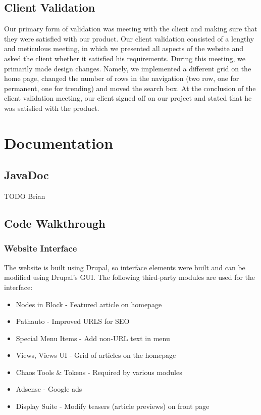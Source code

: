 \documentclass[11pt]{article} %
\begin{document}
\subsection{Client Validation}

Our primary form of validation was meeting with the client and making sure that they were satisfied with our product. Our client validation consisted of a lengthy and meticulous meeting, in which we presented all aspects of the website and asked the client whether it satisfied his requirements. During this meeting, we primarily made design changes. Namely, we implemented a different grid on the home page, changed the number of rows in the navigation (two row, one for permanent, one for trending) and moved the search box. At the conclusion of the client validation meeting, our client signed off on our project and stated that he was satisfied with the product. 

\section{Documentation}

\subsection{JavaDoc}

TODO Brian

\subsection{Code Walkthrough}

\subsubsection{Website Interface}

The website is built using Drupal, so interface elements were built and can be modified using Drupal’s GUI. The following third-party modules are used for the interface:

\begin{itemize}
\item Nodes in Block - Featured article on homepage
\item Pathauto - Improved URLS for SEO
\item Special Menu Items - Add non-URL text in menu
\item Views, Views UI - Grid of articles on the homepage
\item Chaos Tools \& Tokens - Required by various modules
\item Adsense - Google ads
\item Display Suite - Modify teasers (article previews) on front page
\end{itemize}
\end{document}

